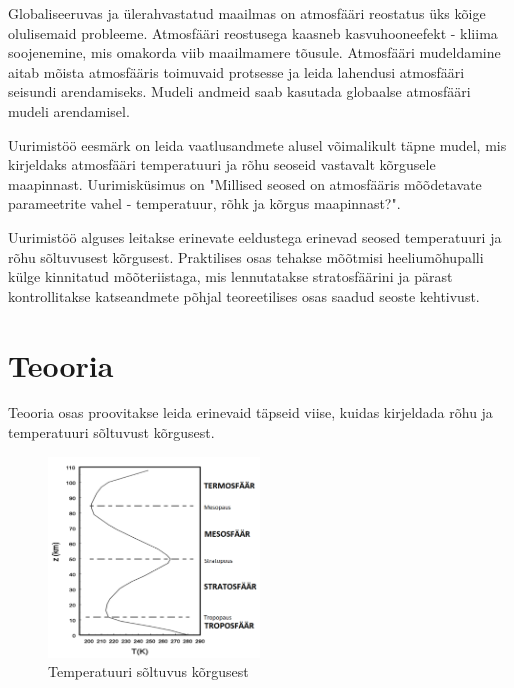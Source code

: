 \documentclass{trkut}%
\begin{document}
\maketitle%
\tableofcontents%

\nummerdame%
Globaliseeruvas ja ülerahvastatud maailmas on atmosfääri reostatus üks kõige olulisemaid probleeme. Atmosfääri reostusega kaasneb kasvuhooneefekt - kliima soojenemine, mis omakorda viib maailmamere tõusule. Atmosfääri mudeldamine aitab mõista atmosfääris toimuvaid protsesse ja leida lahendusi atmosfääri seisundi arendamiseks. Mudeli andmeid saab kasutada globaalse atmosfääri mudeli arendamisel.

Uurimistöö eesmärk on leida vaatlusandmete alusel võimalikult täpne mudel, mis kirjeldaks atmosfääri temperatuuri ja rõhu seoseid vastavalt kõrgusele maapinnast. Uurimisküsimus on "Millised seosed on atmosfääris mõõdetavate parameetrite vahel - temperatuur, rõhk ja kõrgus maapinnast?".

Uurimistöö alguses leitakse erinevate eeldustega erinevad seosed temperatuuri ja rõhu sõltuvusest kõrgusest. Praktilises osas tehakse mõõtmisi heeliumõhupalli külge kinnitatud mõõteriistaga, mis lennutatakse stratosfäärini ja pärast kontrollitakse katseandmete põhjal teoreetilises osas saadud seoste kehtivust.





\chapter{Teooria}
Teooria osas proovitakse leida erinevaid täpseid viise, kuidas kirjeldada rõhu ja temperatuuri sõltuvust kõrgusest.

\begin{figure}[h]
	\includegraphics[width=0.5\textwidth]{PicGra/Profile2.png}
	\caption{Temperatuuri sõltuvus kõrgusest}
	\label{profile}%
\end{figure}
\end{document}
